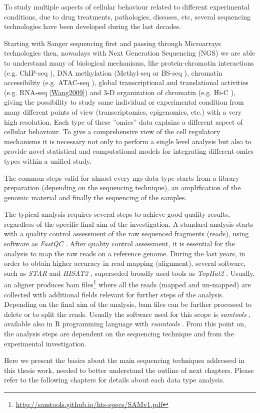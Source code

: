 To study multiple aspects of cellular behaviour related to different experimental conditions, due to drug treatments, pathologies, diseases, etc, several sequencing technologies have been developed during the last decades.

Starting with Sanger sequencing first and passing through Microarrays technologies then, nowadays with Next Generation Sequencing (NGS) we are able to understand many of biological mechanisms, like protein-chromatin interactions (e.g. ChIP-seq \cite{Park2009}), DNA methylation (Methyl-seq or BS-seq \cite{Frommer1992}), chromatin accessibility (e.g. ATAC-seq \cite{Buenrostro2013}), global transcriptional and translational activities (e.g. RNA-seq \ref{Wang2009}) and 3-D organization of chromatin (e.g. Hi-C \cite{VanBerkum2010}), giving the possibility to study same individual or experimental condition from many different points of view (transcriptomics, epigenomics, etc.) with a very high resolution. Each type of these ''omics'' data explains a different aspect of cellular behaviour. 
To give a comprehensive view of the cell regulatory mechanisms it is necessary not only to perform a single level analysis but also to provide novel statistical and computational models for integrating different omics types within a unified study.

The common steps valid for almost every \gls{ngs} data type starts from a library preparation (depending on the sequencing technique), an amplification of the genomic material and finally the sequencing of the samples.

The typical analysis requires several steps to achieve good quality results, regardless of the specific final aim of the investigation.
A standard analysis starts with a quality control assessment of the raw sequenced fragments (reads), using software as \textit{FastQC} \cite{Andrews2010}.
After quality control assessment, it is essential for the analysis to map the raw reads on a reference genome. 
During the last years, in order to obtain higher accuracy in read mapping (alignment), several software, such as \textit{STAR} \cite{Dobin2013} and \textit{HISAT2} \cite{Kim2015}, superseded broadly used tools as \textit{TopHat2} \cite{Kim2013}.
Usually, an aligner produces \gls{bam} files\footnote{\url{http://samtools.github.io/hts-specs/SAMv1.pdf}} \cite{Li2009} where all the reads (mapped and un-mapped) are collected with additional fields relevant for further steps of the analysis.
Depending on the final aim of the analysis, \gls{bam} files can be further processed to delete or to split the reads. 
Usually the software used for this scope is \textit{samtools} \cite{Li2009, Li2011}, available also in R programming language with \textit{rsamtools} \cite{Morgan}.
From this point on, the analysis steps are dependent on the sequencing technique and from the experimental investigation.

Here we present the basics about the main sequencing techniques addressed in this thesis work, needed to better understand the outline of next chapters.
Please refer to the following chapters for details about each data type analysis.